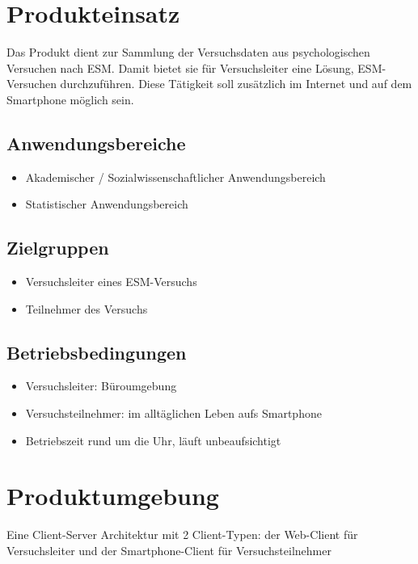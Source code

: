 \documentclass[a4paper]{scrreprt}
\begin{document}
    \chapter{Produkteinsatz}
        Das Produkt dient zur Sammlung der Versuchsdaten aus psychologischen Versuchen nach ESM. Damit bietet sie für Versuchsleiter eine Lösung, ESM-Versuchen durchzuführen. Diese Tätigkeit soll zusätzlich im Internet und auf dem Smartphone möglich sein.
 
        \section{Anwendungsbereiche}
            \begin{itemize}
                \item Akademischer / Sozialwissenschaftlicher Anwendungsbereich
                \item Statistischer Anwendungsbereich
            \end{itemize}
 
        \section{Zielgruppen}
            \begin{itemize}
                \item Versuchsleiter eines ESM-Versuchs
                \item Teilnehmer des Versuchs
            \end{itemize}
 
        \section{Betriebsbedingungen}
            \begin{itemize}
                \item Versuchsleiter: Büroumgebung
                \item Versuchsteilnehmer: im alltäglichen Leben aufs Smartphone
                \item Betriebszeit rund um die Uhr, läuft unbeaufsichtigt
            \end{itemize}
 
    \chapter{Produktumgebung}
        Eine Client-Server Architektur mit 2 Client-Typen: der Web-Client für Versuchsleiter und der Smartphone-Client für Versuchsteilnehmer
\end{document}
